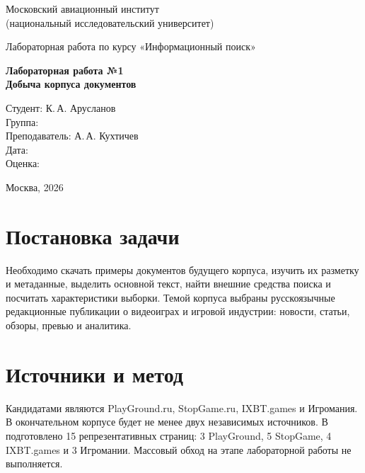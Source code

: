 \documentclass[12pt,a4paper]{article}
\newcommand{\code}[1]{\texttt{\detokenize{#1}}}
\begin{document}
\begin{titlepage}
\begin{center}
{\large Московский авиационный институт\\
(национальный исследовательский университет)}

\vfill
Лабораторная работа по курсу «Информационный поиск»

\vspace{12mm}
{\Large \textbf{Лабораторная работа №1}}\\
{\large \textbf{Добыча корпуса документов}}

\vfill
\begin{flushright}
Студент: К.\,А. Арусланов\\
Группа: \underline{\hspace{45mm}}\\
Преподаватель: А.\,А. Кухтичев\\
Дата: \underline{\hspace{45mm}}\\
Оценка: \underline{\hspace{45mm}}
\end{flushright}

\vfill
Москва, 2026
\end{center}
\end{titlepage}

\tableofcontents
\newpage

\section{Постановка задачи}

Необходимо скачать примеры документов будущего корпуса, изучить их разметку
и метаданные, выделить основной текст, найти внешние средства поиска и
посчитать характеристики выборки. Темой корпуса выбраны русскоязычные
редакционные публикации о видеоиграх и игровой индустрии: новости, статьи,
обзоры, превью и аналитика.

\section{Источники и метод}

Кандидатами являются PlayGround.ru, StopGame.ru, IXBT.games и Игромания.
В окончательном корпусе будет не менее двух независимых источников. В
\code{urls.txt} подготовлено 15 репрезентативных страниц: 3 PlayGround, 5
StopGame, 4 IXBT.games и 3 Игромании. Массовый обход на этапе лабораторной
работы не выполняется.
\end{document}
